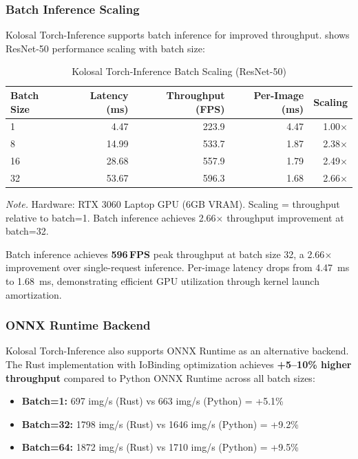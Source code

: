 \documentclass[10pt,twocolumn,a4paper]{article}
\theoremstyle{definition}
\theoremstyle{plain}
\newcommand{\timesX}[1]{#1$\times$}
\newcommand{\fpssuffix}{\,FPS}
\begin{document}
\subsubsection{Batch Inference Scaling}

Kolosal Torch-Inference supports batch inference for improved throughput.  shows ResNet-50 performance scaling with batch size:

\begin{table}[t]
\centering
\caption{Kolosal Torch-Inference Batch Scaling (ResNet-50)}
\label{tab:batch_scaling}
\scriptsize
\setlength{\tabcolsep}{4pt}
\begin{tabular}{@{}lrrrr@{}}
\toprule
\textbf{Batch Size} & \textbf{Latency (ms)} & \textbf{Throughput (FPS)} & \textbf{Per-Image (ms)} & \textbf{Scaling} \\
\midrule
1 & 4.47 & 223.9 & 4.47 & \timesX{1.00} \\
8 & 14.99 & 533.7 & 1.87 & \timesX{2.38} \\
16 & 28.68 & 557.9 & 1.79 & \timesX{2.49} \\
32 & 53.67 & 596.3 & 1.68 & \timesX{2.66} \\
\bottomrule
\end{tabular}

\vspace{0.5em}
\noindent\textit{Note.} Hardware: RTX 3060 Laptop GPU (6GB VRAM). Scaling = throughput relative to batch=1. Batch inference achieves \timesX{2.66} throughput improvement at batch=32.
\end{table}

Batch inference achieves \textbf{\num{596}\fpssuffix{}} peak throughput at batch size 32, a \timesX{2.66} improvement over single-request inference. Per-image latency drops from \SI{4.47}{\milli\second} to \SI{1.68}{\milli\second}, demonstrating efficient GPU utilization through kernel launch amortization.

\subsubsection{ONNX Runtime Backend}

Kolosal Torch-Inference also supports ONNX Runtime as an alternative backend. The Rust implementation with IoBinding optimization achieves \textbf{+5--10\% higher throughput} compared to Python ONNX Runtime across all batch sizes:

\begin{itemize}
    \item \textbf{Batch=1:} \num{697} img/s (Rust) vs \num{663} img/s (Python) = +5.1\%
    \item \textbf{Batch=32:} \num{1798} img/s (Rust) vs \num{1646} img/s (Python) = +9.2\%
    \item \textbf{Batch=64:} \num{1872} img/s (Rust) vs \num{1710} img/s (Python) = +9.5\%
\end{itemize}
\end{document}
